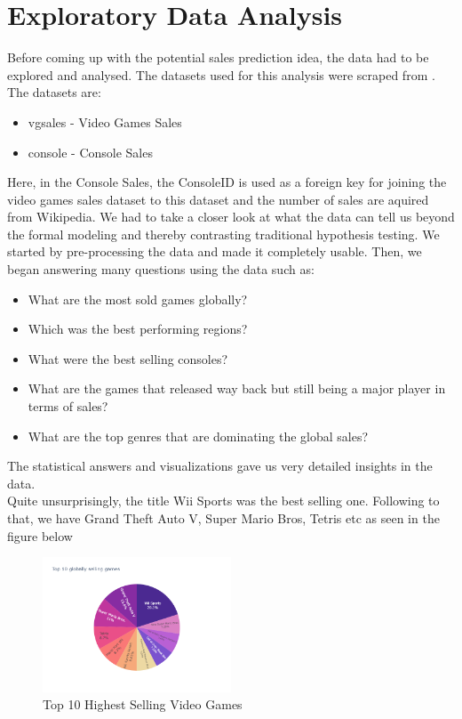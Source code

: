 \documentclass[conference]{IEEEtran}
\begin{document}
\section{Exploratory Data Analysis}
Before coming up with the potential sales prediction idea, the data had to be explored and analysed. The datasets used for this analysis were scraped from \cite{b2}. The datasets are:
\begin{itemize}
    \item vgsales - Video Games Sales \cite{b3}
    \item console - Console Sales \cite{b4}
\end{itemize}
Here, in the Console Sales, the ConsoleID is used as a foreign key for joining the video games sales dataset to this dataset and the number of sales are aquired from Wikipedia\cite{b5}. We had to take a closer look at what the data can tell us beyond the formal modeling and thereby contrasting traditional hypothesis testing. We started by pre-processing the data and made it completely usable. Then, we began answering many questions using the data such as:
\begin{itemize}
    \item What are the most sold games globally?
    \item Which was the best performing regions?
    \item What were the best selling consoles?
    \item What are the games that released way back but still being a major player in terms of sales?
    \item What are the top genres that are dominating the global sales?
\end{itemize}
The statistical answers and visualizations gave us very detailed insights in the data.\\
Quite unsurprisingly, the title Wii Sports was the best selling one. Following to that, we have Grand Theft Auto V, Super Mario Bros, Tetris etc as seen in the figure below\\
\begin{figure}[h]
    \centering
    \includegraphics[width=0.5\textwidth]{top10games.png}
    \caption{Top 10 Highest Selling Video Games}
\end{figure}
\end{document}
